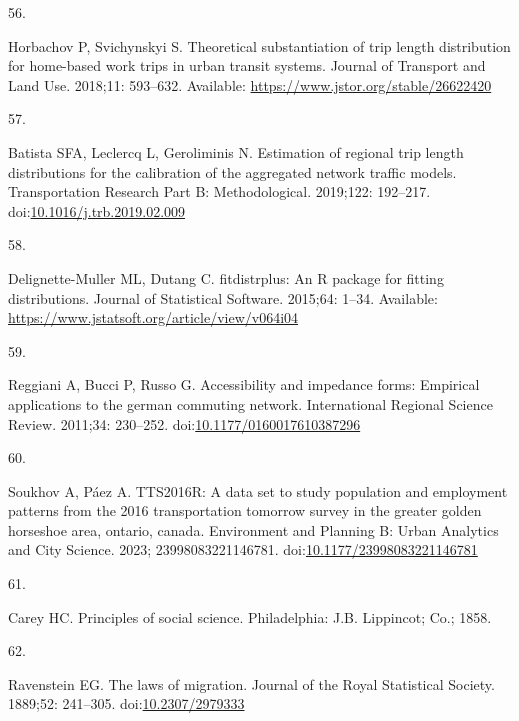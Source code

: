 \documentclass[10pt,letterpaper]{article}
\newlength{\cslhangindent}
\newlength{\csllabelwidth}
\newlength{\cslentryspacingunit} %
\newenvironment{CSLReferences}[2] %
 {%
  \setlength{\parindent}{0pt}
  \ifodd #1
  \let\oldpar\par
  \def\par{\hangindent=\cslhangindent\oldpar}
  \fi
  \setlength{\parskip}{#2\cslentryspacingunit}
 }%
 {}
\newcommand{\CSLLeftMargin}[1]{\parbox[t]{\csllabelwidth}{#1}}
\newcommand{\CSLRightInline}[1]{\parbox[t]{\linewidth - \csllabelwidth}{#1}\break}
\begin{document}
\begin{CSLReferences}{0}{0}
\leavevmode{}%
\CSLLeftMargin{56. }%
\CSLRightInline{Horbachov P, Svichynskyi S. Theoretical substantiation
of trip length distribution for home-based work trips in urban transit
systems. Journal of Transport and Land Use. 2018;11: 593--632.
Available: \url{https://www.jstor.org/stable/26622420}}

\leavevmode{}%
\CSLLeftMargin{57. }%
\CSLRightInline{Batista SFA, Leclercq L, Geroliminis N. Estimation of
regional trip length distributions for the calibration of the aggregated
network traffic models. Transportation Research Part B: Methodological.
2019;122: 192--217.
doi:\href{https://doi.org/10.1016/j.trb.2019.02.009}{10.1016/j.trb.2019.02.009}}

\leavevmode{}%
\CSLLeftMargin{58. }%
\CSLRightInline{Delignette-Muller ML, Dutang C. {fitdistrplus}: An {R}
package for fitting distributions. Journal of Statistical Software.
2015;64: 1--34. Available:
\url{https://www.jstatsoft.org/article/view/v064i04}}

\leavevmode{}%
\CSLLeftMargin{59. }%
\CSLRightInline{Reggiani A, Bucci P, Russo G. Accessibility and
impedance forms: Empirical applications to the german commuting network.
International Regional Science Review. 2011;34: 230--252.
doi:\href{https://doi.org/10.1177/0160017610387296}{10.1177/0160017610387296}}

\leavevmode{}%
\CSLLeftMargin{60. }%
\CSLRightInline{Soukhov A, Páez A. {TTS}2016R: A data set to study
population and employment patterns from the 2016 transportation tomorrow
survey in the greater golden horseshoe area, ontario, canada.
Environment and Planning B: Urban Analytics and City Science. 2023;
23998083221146781.
doi:\href{https://doi.org/10.1177/23998083221146781}{10.1177/23998083221146781}}

\leavevmode{}%
\CSLLeftMargin{61. }%
\CSLRightInline{Carey HC. Principles of social science. Philadelphia:
J.B. Lippincot; Co.; 1858. }

\leavevmode{}%
\CSLLeftMargin{62. }%
\CSLRightInline{Ravenstein EG. The laws of migration. Journal of the
Royal Statistical Society. 1889;52: 241--305.
doi:\href{https://doi.org/10.2307/2979333}{10.2307/2979333}}


\end{CSLReferences}
\end{document}
